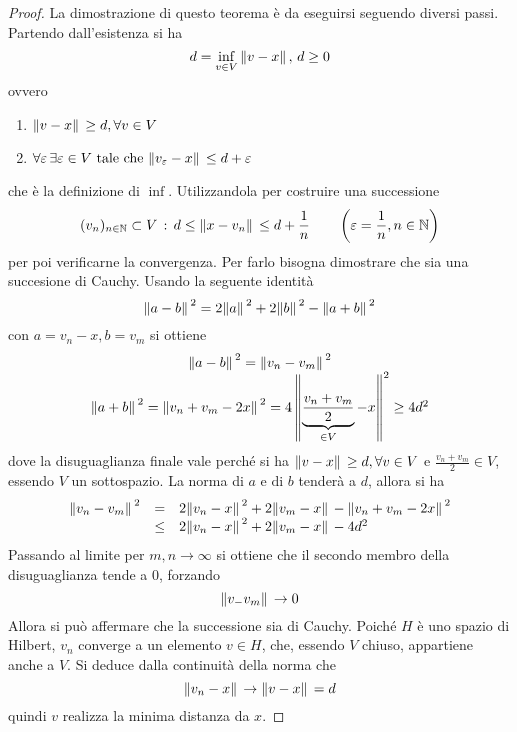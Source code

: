\documentclass[a4paper,12pt, draft]{article}
\theoremstyle{break}
\let\epsilon\varepsilon
\numberwithin{equation}{section}
\begin{document}
\begin{proof}
  La dimostrazione di questo teorema è da eseguirsi seguendo diversi passi. Partendo dall'esistenza si ha 
  \[
  d= \inf_{v \in V} \norm*{v - x}, \, d \geq 0
  \]
  ovvero
  \begin{enumerate}
    \item \(\norm*{v - x} \geq d, \forall v \in V\)
    \item \(\forall \epsilon \, \exists\epsilon \in V \mbox{ tale che } \norm*{v_{\epsilon} - x} \leq d + \epsilon\)
  \end{enumerate}
  che è la definizione di \(\inf\). Utilizzandola per costruire una successione 
  \begin{equation}
    (v_n)_{n \in \mathbb{N}} \subset V \, : \, d \leq\norm*{x - v_n} \leq d + \frac{1}{n} \qquad \left(\epsilon = \frac{1}{n}, n \in \mathbb{N}\right)
    \end{equation}
    per poi verificarne la convergenza. Per farlo bisogna dimostrare che sia una succesione di Cauchy. Usando la seguente identità
    \[
      \norm*{a - b}^2 = 2\norm*{a}^2 + 2\norm*{b}^2 - \norm*{a + b}^2
    \]
    con \(a = v_n - x, b = v_m\) si ottiene
    \[
      \begin{array}{c}
      \norm*{a - b}^2 = \norm*{v_n - v_m}^2 \\
      \norm*{a + b}^2 = \norm*{v_n + v_m - 2x}^2 = 4\left\|\underbrace{\frac{v_n + v_m}{2}}_{\in V} - x \right\|^2 \geq 4d^2
    \end{array} 
    \]
    dove la disuguaglianza finale vale perché si ha \(\norm*{v - x} \geq d, \forall v \in V\) e \(\frac{v_n + v_m}{2} \in V\), essendo \(V\) un sottospazio.
    La norma di \(a \mbox{ e di } b\) tenderà a \(d\), allora si ha 
    \[
    \begin{array}{lcl}
      \norm*{v_n - v_m}^2 & = & 2\norm*{v_n - x}^2 + 2\norm*{v_m - x} - \norm*{v_n + v_m - 2x}^2 \\
      & \leq & 2\norm*{v_n - x}^2 + 2\norm*{v_m -x} - 4d^2
    \end{array}
    \]
    Passando al limite per \(m,n \to \infty\) si ottiene che il secondo membro della disuguaglianza tende a \(0\), forzando 
    \[
     \norm*{v_ - v_m} \to 0
    \]
    Allora si può affermare che la successione sia di Cauchy. Poiché \(H\) è uno spazio di Hilbert, \(v_n\) converge a un elemento \(v \in H\), che, essendo \(V\) chiuso, appartiene anche a \(V\).
    Si deduce dalla continuità della norma che 
    \[
    \norm*{v_n - x} \to \norm*{v - x} = d  
    \]
    quindi \(v\) realizza la minima distanza da \(x\).

\end{proof}
\end{document}
